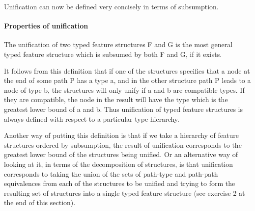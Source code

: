 \documentclass[12pt]{report}
\begin{document}
Unification can now be defined very concisely  in terms of subsumption.
\paragraph{Properties of unification}
The unification of two typed feature structures F and G is the most general
typed feature structure which is subsumed by both F and G, if it
exists.

It follows from this definition
that if one of the structures specifies that a node at the end of 
some path P
has a type {\type a}, and in the other structure path P leads 
to a node of
type {\type b}, the structures will only unify
if {\type a} and {\type b} are compatible types.
If they are compatible, the node in the result will have 
the type which is the greatest lower bound of {\type a}
and {\type b}.
Thus unification of typed feature structures is always 
defined with respect to a particular type hierarchy.

Another way of putting this definition
is that if we take a hierarchy of feature structures ordered by
subsumption, the result of unification corresponds to the
greatest lower bound of the structures being unified.
Or an alternative way of looking at it,
in terms of the
decomposition of structures,
is that unification corresponds to taking the
union of the sets of path-type and path-path 
equivalences from each of the structures to be unified
and trying to form the resulting set of structures
into a single typed feature structure (see exercise 2 at the end of this
section).
\end{document}
